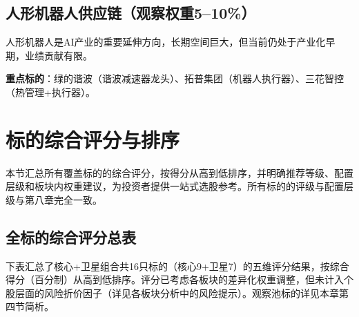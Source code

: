 \subsection{人形机器人供应链（观察权重5--10\%）}

人形机器人是AI产业的重要延伸方向，长期空间巨大，但当前仍处于产业化早期，业绩贡献有限。

\textbf{重点标的}：绿的谐波（谐波减速器龙头）、拓普集团（机器人执行器）、三花智控（热管理+执行器）。

\section{标的综合评分与排序}

本节汇总所有覆盖标的的综合评分，按得分从高到低排序，并明确推荐等级、配置层级和板块内权重建议，为投资者提供一站式选股参考。所有标的的评级与配置层级与第八章完全一致。

\subsection{全标的综合评分总表}

下表汇总了核心+卫星组合共16只标的（核心9+卫星7）的五维评分结果，按综合得分（百分制）从高到低排序。评分已考虑各板块的差异化权重调整，但未计入个股层面的风险折价因子（详见各板块分析中的风险提示）。观察池标的详见本章第四节简析。


